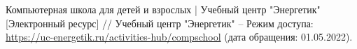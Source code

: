 \begin{thebibliography}{00}
        Компьютерная школа для детей и взрослых | Учебный центр "Энергетик"
        [Электронный ресурс] //
        Учебный центр "Энергетик"
        --
        Режим доступа:
        \href{https://uc-energetik.ru/activities-hub/compschool}{https://uc-energetik.ru/activities-hub/compschool}
        (дата обращения: 01.05.2022).



        \begin{comment}

    \bibitem{livejournal}
        Главное - ЖЖ
        [Электронный ресурс] //
        LiveJournal — сервис для ведения блога и развития сообщества
        --
        Режим доступа:
        \href{https://www.livejournal.com/}{https://www.livejournal.com/}
        
    \bibitem{kickstarter}
        Kickstarter
        [Электронный ресурс] //
        Kickstarter - краудфандинговая платформа.
        --
        Режим доступа:
        \href{https://www.kickstarter.com/}{https://www.kickstarter.com/}

    \bibitem{ozon}
        OZON — интернет-магазин. Миллионы товаров по выгодным ценам
        [Электронный ресурс] //
        OZON. Интернет магазин
        --
        Режим доступа:
        \href{https://www.ozon.ru/}{https://www.ozon.ru/}

    \bibitem{stepik}
        Stepik
        [Электронный ресурс] //
        Stepik - интернет платформа для создания и распространения обучающего контента
        --
        Режим доступа:
        \href{https://stepik.org}{https://stepik.org/}

    \bibitem{vk}
        ВКонтакте
        [Электронный ресурс] //
        ВКонтакте - социальная сеть
        --
        Режим доступа:
        \href{https://vk.com/}{https://vk.com/}

    \bibitem{wiki}
        Википедия
        [Электронный ресурс] //
        Википедия. Свободная энциклопедия
        --
        Режим доступа:
        \href{https://ru.wikipedia.org/}{https://ru.wikipedia.org/}

    \bibitem{wiki-CMS}
        CMS -- Википедия 
        [Электронный ресурс] //
        Википедия. Свободная энциклопедия
        --
        Режим доступа:
        \href{https://ru.wikipedia.org/wiki/CMS}{https://ru.wikipedia.org/wiki/CMS}

    \bibitem{cmsmagazine}
        Движки для сайтов, платные и бесплатные CMS системы, каталог систем управления сайтами
        [Электронный ресурс] //
        CMS Magazine - digital-журнал
        --
        Режим доступа:
        \href{https://cmsmagazine.ru/cms/}{https://cmsmagazine.ru/cms/}


\end{comment}
\end{thebibliography}
